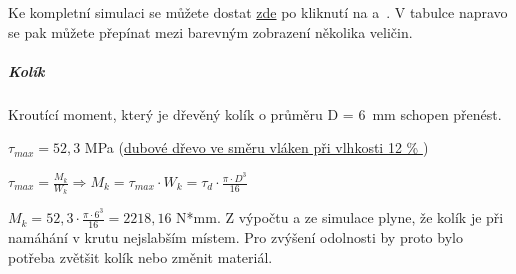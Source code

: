 Ke kompletní simulaci se můžete dostat \href{https://myhub.autodesk360.com/ue2d7aa41/g/shares/SH56a43QTfd62c1cd96843f1e03a0eb48053?viewState=NoIgbgDAdAjCA0IDeAdEAXAngBwKZoC40BlASwFsBXAGwEN1SB7AOzXjVoGdPd1C0ARjABsATlEQItALQBjcbmkAWCMIjSBuWgA5lAM22ilAVgAmMAOyy9\%2BBGkYCAVrlnoAkqcIBmAL4gAukA}{zde}
po kliknutí na  a~. V tabulce napravo se pak můžete přepínat mezi barevným zobrazení několika veličin.

\subparagraph{Kolík}
Kroutící moment, který je dřevěný kolík o průměru D = 6~mm schopen přenést. 

\begin{table}[h]
    \centering
    \caption{Tabulka použitých symbolu pro napětí v kolíku v tahu}
    \label{tab:M3_symboly_kolik}
\end{table}

$ \tau_{max} = 52,3 $ MPa (\href{https://is.mendelu.cz/eknihovna/opory/zobraz_cast.pl?fit_w=1;cast=9190}{dubové dřevo ve směru vláken při vlhkosti 12 \% })

$ \tau_{max} = \frac{M_k}{W_k} \Rightarrow M_k = \tau_{max} \cdot W_k = \tau _d \cdot \frac{\pi \cdot D^3}{16} $

$ M_k = 52,3 \cdot \frac{\pi \cdot 6^3}{16} = 2 218,16 $ N*mm. Z výpočtu a ze simulace plyne, že kolík je při namáhání v krutu nejslabším místem. Pro zvýšení odolnosti by proto bylo 
potřeba zvětšit kolík nebo změnit materiál.